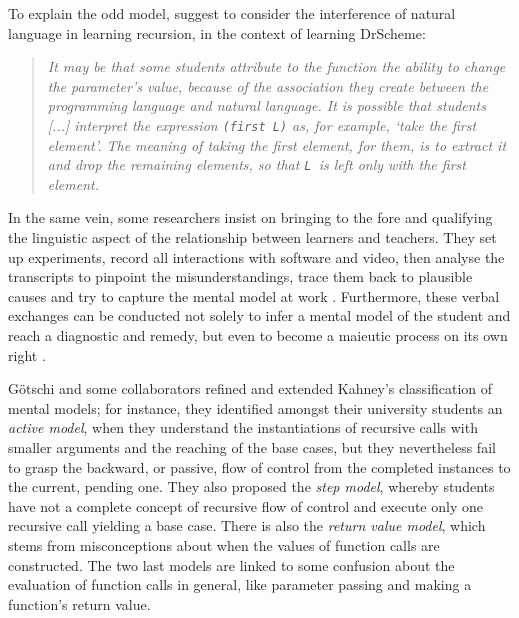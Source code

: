 \documentclass[11pt,a4paper]{article}
\newcommand\plang[1]{\textsf{#1}\xspace}
\newcommand\exc[1]{\texttt{\small #1}}
\begin{document}
To explain the odd model, \textcite{PazLapidot:2004} suggest to
consider the interference of natural language in learning recursion,
in the context of learning \plang{DrScheme}:
\begin{quote}
\it It may be that some students attribute to the function the ability
to change the parameter's value, because of the association they
create between the programming language and natural language. It is
possible that students [...]  interpret the expression \exc{(first L)}
as, for example, `take the first element'. The meaning of taking the
first element, for them, is to extract it and drop the remaining
elements, so that \exc{L}~is left only with the first element.
\end{quote}
In the same vein, some researchers insist on bringing to the fore and
qualifying the linguistic aspect of the relationship between learners
and teachers. They set up experiments, record all interactions with
software and video, then analyse the transcripts to pinpoint the
misunderstandings, trace them back to plausible causes and try to
capture the mental model at work
\citep{AndersonPirolliFarrell:1984,LevyLapidot:2000,LevyLapidotPaz:2001,Levy:2001,MurnaneWarner:2001,LevyLapidot:2002}.
Furthermore, these verbal exchanges can be conducted not solely to
infer a mental model of the student and reach a diagnostic and remedy,
but even to become a maieutic process on its own right
\citep{ChangWangDaiSung:1999,ChangLinSungChen:2000}.

G\"otschi and some collaborators
\citep{Gotschi:2003,GotschiSandersGalpin:2003,SandersGalpinGotschi:2006}
refined and extended Kahney's classification of mental models; for
instance, they identified amongst their university students an
\emph{active model}, when they understand the instantiations of
recursive calls with smaller arguments and the reaching of the base
cases, but they nevertheless fail to grasp the backward, or passive,
flow of control from the completed instances to the current, pending
one. They also proposed the \emph{step model}, whereby students have
not a complete concept of recursive flow of control and execute only
one recursive call yielding a base case. There is also the
\emph{return value model}, which stems from misconceptions about when
the values of function calls are constructed. The two last models are
linked to some confusion about the evaluation of function calls in
general, like parameter passing and making a function's return value.
\end{document}

